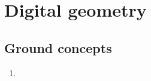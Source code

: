 \chapter{Digital geometry}


\section{Ground concepts}
	\begin{enumerate}
		\item{	\cite{klette04} }		
	\end{enumerate}

	